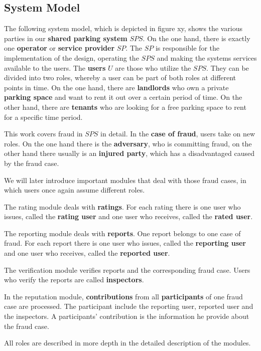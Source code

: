 \documentclass[
a4paper,     %
titlepage,   %
14pt         %
]{scrartcl}  %
\theoremstyle{mystyle}
\begin{document}
\subsection{System Model}
The following system model, which is depicted in figure xy, shows the various parties in our \textbf{shared parking system} $SPS$. On the one hand, there is exactly one \textbf{operator} or \textbf{service provider} $SP$. The $SP$ is responsible for the implementation of the design, operating the $SPS$ and making the systems services available to the users. The \textbf{users} $U$ are those who utilize the $SPS$. They can be divided into two roles, whereby a user can be part of both roles at different points in time. On the one hand, there are \textbf{landlords} who own a private \textbf{parking space} and want to rent it out over a certain period of time. On the other hand, there are \textbf{tenants} who are looking for a free parking space to rent for a specific time period.

This work covers fraud in $SPS$ in detail. In the \textbf{case of fraud}, users take on new roles. On the one hand there is the \textbf{adversary}, who is committing fraud, on the other hand there usually is an \textbf{injured party}, which has a disadvantaged caused by the fraud case.

We will later introduce important modules that deal with those fraud cases, in which users once again assume different roles.

The rating module deals with \textbf{ratings}. For each rating there is one user who issues, called the\textbf{ rating user} and one user who receives, called the \textbf{rated user}.

The reporting module deals with \textbf{reports}. One report belongs to one case of fraud. For each report there is one user who issues, called the \textbf{reporting user} and one user who receives, called the \textbf{reported user}.

The verification module verifies reports and the corresponding fraud case. Users who verify the reports are called \textbf{inspectors}.

In the reputation module, \textbf{contributions} from all \textbf{participants} of one fraud case are processed. The participant include the reporting user, reported user and the inspectors. A participants' contribution is the information he provide about the fraud case.

All roles are described in more depth in the detailed description of the modules.\\
\end{document}
